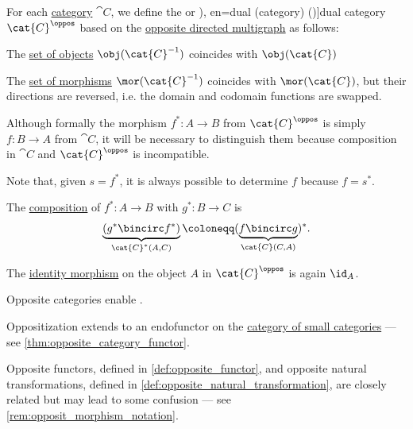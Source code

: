 \begin{definition}\label{def:opposite_category}
  For each \hyperref[def:category]{category} \( \cat{C} \), we define the  or \term[ru=двойственная (категория) (\cite[19]{ЦаленкоШульгейфер1974ОсновыТеорииКатегорий}), en=dual (category) (\cite[def. 2.4.1]{Schubert1972Categories})]{dual} category \( \cat{C}^\oppos \) based on the \hyperref[def:directed_multigraph/opposite]{opposite directed multigraph} as follows:
  \begin{thmenum}
     The \hyperref[def:category/objects]{set of objects} \( \obj(\cat{C}^{-1}) \) coincides with \( \obj(\cat{C}) \)

     The \hyperref[def:category/morphisms]{set of morphisms} \( \mor(\cat{C}^{-1}) \) coincides with \( \mor(\cat{C}) \), but their directions are reversed, i.e. the domain and codomain functions are swapped.

    Although formally the morphism \( f^*: A \to B \) from \( \cat{C}^\oppos \) is simply \( f: B \to A \) from \( \cat{C} \), it will be necessary to distinguish them because composition in \( \cat{C} \) and \( \cat{C}^\oppos \) is incompatible.

    Note that, given \( s = f^* \), it is always possible to determine \( f \) because \( f = s^* \).

     The \hyperref[def:category/composition]{composition} of \( f^*: A \to B \) with \( g^*: B \to C \) is
    \begin{equation}\label{eq:def:opposite_category/composition}
      \underbrace{(g^* \bincirc f^*)}_{\cat{C}^*(A, C)} \coloneqq (\underbrace{f \bincirc g}_{\cat{C}(C, A)})^*.
    \end{equation}

     The \hyperref[def:category/identity]{identity morphism} on the object \( A \) in \( \cat{C}^\oppos \) is again \( \id_A \).
  \end{thmenum}
\end{definition}
\begin{comments}
  \item Opposite categories enable .

  \item Oppositization extends to an endofunctor on the \hyperref[def:category_of_small_categories]{category of small categories} --- see \cref{thm:opposite_category_functor}.

  \item Opposite functors, defined in \cref{def:opposite_functor}, and opposite natural transformations, defined in \cref{def:opposite_natural_transformation}, are closely related but may lead to some confusion --- see \cref{rem:opposit_morphism_notation}.
\end{comments}

